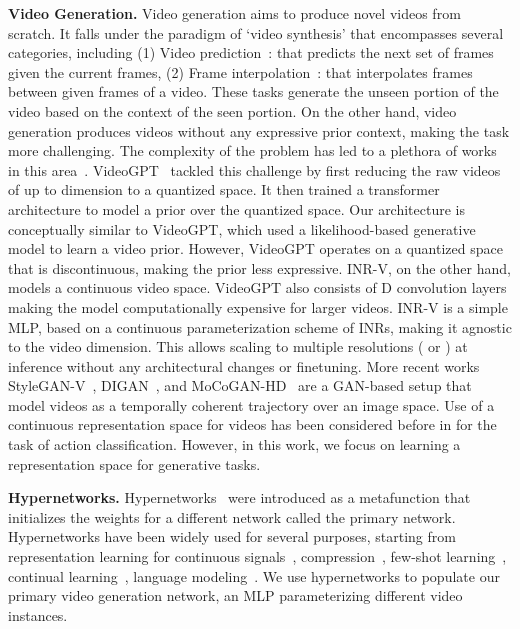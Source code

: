 \documentclass[10pt]{article} \usepackage[accepted]{tmlr}
\begin{document}
\textbf{Video Generation.} Video generation aims to produce novel videos from scratch. It falls under the paradigm of `video synthesis' that encompasses several categories, including (1) Video prediction~\cite{transformersynth, ccvs, vqvaevideopred}: that predicts the next set of frames given the current frames, (2) Frame interpolation~\cite{videointerpolationassymetric, videointerpolationsoftmaxsplatting, videointerpolationadaptiveseperableconvolution,
videointerpolationwithouttemporalpriors}: that interpolates frames between given frames of a video. These tasks generate the unseen portion of the video based on the context of the seen portion. 
On the other hand, video generation produces videos without any expressive prior context, making the task more challenging. The complexity of the problem has led to a plethora of works in this area~\cite{mocogan-hd, mocogan, stylegan-v, dvd-gan, tgan, digan}. VideoGPT~\cite{videogpt} tackled this challenge by first reducing the raw videos of up to  dimension to a quantized space. It then trained a transformer architecture to model a prior over the quantized space. Our architecture is conceptually similar to VideoGPT, which used a likelihood-based generative model to learn a video prior. However, VideoGPT operates on a quantized space that is discontinuous, making the prior less expressive. INR-V, on the other hand, models a continuous video space. VideoGPT also consists of D convolution layers making the model computationally expensive for larger videos. INR-V is a simple MLP, based on a continuous parameterization scheme of INRs, making it agnostic to the video dimension. This allows scaling to multiple resolutions ( or ) at inference without any architectural changes or finetuning. 
More recent works StyleGAN-V~\cite{stylegan-v}, DIGAN~\cite{digan}, and MoCoGAN-HD~\cite{mocogan-hd} are a GAN-based setup that model videos as a temporally coherent trajectory over an image space. 
Use of a continuous representation space for videos has been considered before in \cite{continuous_action_classification, continuous_action_classification_1} for the task of action classification. However, in this work, we focus on learning a representation space for generative tasks.

\textbf{Hypernetworks.} Hypernetworks~\cite{hypernetwork} were introduced as a metafunction that initializes the weights for a different network called the primary network. Hypernetworks have been widely used for several purposes, starting from representation learning for continuous signals~\cite{deepsdf, lfns, metasdf, siren, occunet, 3dhypernet2}, compression~\cite{hncompress1, hncompress2}, few-shot learning~\cite{hnfewshot1, hnfewshot2}, continual learning~\cite{continualhypernet}, language modeling~\cite{hnlangmodel}.
We use hypernetworks to populate our primary video generation network, an MLP parameterizing different video instances. 
\end{document}
